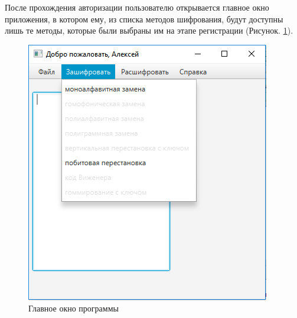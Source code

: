 \documentclass[a4paper,12pt]{article}
\begin{document}
\par После прохождения авторизации пользователю открывается главное окно приложения, в котором ему, из списка методов шифрования, будут доступны лишь те методы, которые были выбраны им на этапе регистрации (Рисунок. \ref{fig:main_form}).
\begin{center}
	\begin{figure}[h!]
		\centering
   		\includegraphics[scale=0.5]{img/main_form.png}
   		\caption{Главное окно программы}
   		\label{fig:main_form}
    \end{figure}
\end{center}
\end{document}

